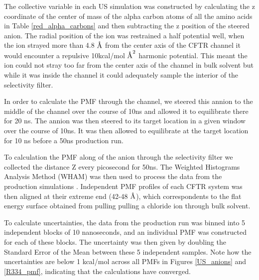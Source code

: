 The collective variable in each US simulation was constructed by calculating the z coordinate of the center of mass of the alpha carbon atoms of all the amino acids in Table \ref{red_alpha_carbons} and then subtracting the z position of the steered anion. The radial position of the ion was restrained a half potential well, when the ion strayed more than 4.8 $\textup{\AA}$ from the center axis of the CFTR channel it would encounter a repulsive 10kcal/mol $\textup{\AA}^2$ harmonic potential. This meant the ion could not stray too far from the center axis of the channel in bulk solvent but while it was inside the channel it could adequately sample the interior of the selectivity filter.

In order to calculate the PMF through the channel, we steered this annion to the middle of the channel over the course of 10ns and allowed it to equilibrate there for 20 ns. The annion was then steered to its target location in a given window over the course of 10ns. It was then allowed to equilibrate at the target location for 10 ns before a 50ns production run.

To calculation the PMF along of the anion through the selectivity filter we collected the distance Z every picosecond for 50ns. The Weighted Histograms Analysis Method (WHAM) was then used to process the data from the production simulations \cite{grossfield2012}. Independent PMF profiles of each CFTR system was then aligned at their extreme end (42-48 $\textup{\AA}$), which correspondents to the flat energy surface obtained from pulling pulling a chloride ion through bulk solvent. 

To calculate uncertainties, the data from the production run was binned into 5 independent blocks of 10 nanoseconds, and an individual PMF was constructed for each of these blocks. The uncertainty was then given by doubling the Standard Error of the Mean between these 5 independent samples. Note how the uncertainties are below 1 kcal/mol across all PMFs in Figures \ref{US_anions} and \ref{R334_pmf}, indicating that the calculations have converged.

